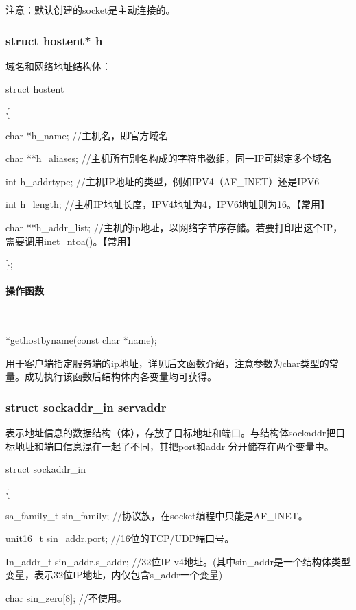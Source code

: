 \documentclass[UTF8]{article}%
\begin{document}
注意：默认创建的socket是主动连接的。

\subsubsection{struct hostent* h}

域名和网络地址结构体：

struct hostent

\{

\qquad    char *h\_name;  //主机名，即官方域名
    
\qquad    char **h\_aliases;  //主机所有别名构成的字符串数组，同一IP可绑定多个域名

\qquad    int h\_addrtype; //主机IP地址的类型，例如IPV4（AF\_INET）还是IPV6

\qquad    int h\_length;  //主机IP地址长度，IPV4地址为4，IPV6地址则为16。【常用】

\qquad    char **h\_addr\_list;  //主机的ip地址，以网络字节序存储。若要打印出这个IP，需要调用inet\_ntoa()。【常用】

\};

\paragraph{操作函数}~{}

*gethostbyname(const char *name);

用于客户端指定服务端的ip地址，详见后文函数介绍，注意参数为char类型的常量。成功执行该函数后结构体内各变量均可获得。

\subsubsection{struct sockaddr\_in servaddr}

表示地址信息的数据结构（体），存放了目标地址和端口。与结构体sockaddr把目标地址和端口信息混在一起了不同，其把port和addr 分开储存在两个变量中。

struct sockaddr\_in

\{

\qquad sa\_family\_t \quad sin\_family; //协议族，在socket编程中只能是AF\_INET。

\qquad unit16\_t \quad sin\_addr.port; //16位的TCP/UDP端口号。

\qquad In\_addr\_t \quad sin\_addr.s\_addr; //32位IP v4地址。(其中sin\_addr是一个结构体类型变量，表示32位IP地址，内仅包含s\_addr一个变量)

\qquad char \quad sin\_zero[8]; //不使用。
\end{document}
